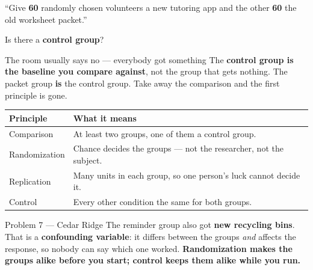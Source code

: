 \documentclass[aspectratio=169, 11pt]{beamer}
\newcommand{\redink}[1]{{\color{redacc}\bfseries #1}}
\begin{document}
\begin{frame}[t, plain]
  \vspace{6pt}
  \begin{center}
    \begin{minipage}{0.86\textwidth}
      ``Give \textbf{60} randomly chosen volunteers a new tutoring app and the other
      \textbf{60} the old worksheet packet.''
      \vspace{6pt}
      \begin{center}\large Is there a \textbf{control group}?\end{center}
    \end{minipage}
  \end{center}
  \vspace{8pt}
  \begin{block}{The room usually says no --- everybody got something}
    The \textbf{control group is the baseline you compare against}, not the group that gets
    nothing. The packet group \redink{is} the control group. Take away the comparison and the
    first principle is gone.
  \end{block}
\end{frame}

\begin{frame}[t, plain]
  \vspace{2pt}
  \begin{center}
    \small
    \renewcommand{\arraystretch}{1.3}
    \begin{tabular}{@{} l l @{}}
    \hline
    \textbf{Principle} & \textbf{What it means} \\
    \hline
    Comparison     & At least two groups, one of them a control group. \\
    Randomization  & Chance decides the groups --- not the researcher, not the subject. \\
    Replication    & Many units in each group, so one person's luck cannot decide it. \\
    Control        & Every other condition the same for both groups. \\
    \hline
    \end{tabular}
  \end{center}
  \vspace{8pt}
  \begin{block}{Problem 7 --- Cedar Ridge}
    The reminder group also got \textbf{new recycling bins}. That is a
    \textbf{\color{cerulean}confounding variable}: it differs between the groups \emph{and}
    affects the response, so nobody can say which one worked.
    \redink{Randomization makes the groups alike before you start; control keeps them alike
    while you run.}
  \end{block}
\end{frame}
\end{document}

